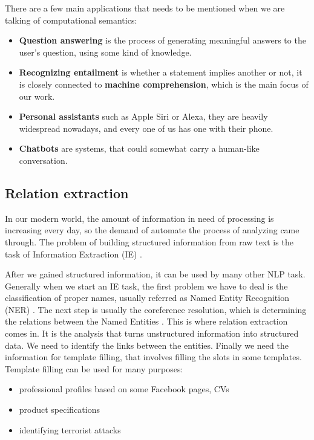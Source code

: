 There are a few main applications that needs to be mentioned when we are talking of computational semantics:
\begin{itemize}
	\item \textbf{Question answering} is the process of generating meaningful answers to the user's question, using some kind of knowledge.
	\item \textbf{Recognizing entailment} is whether a statement implies another or not, it is closely connected to \textbf{machine comprehension}, which is the main focus of our work.
	\item \textbf{Personal assistants} such as Apple Siri or Alexa, they are heavily widespread nowadays, and every one of us has one with their phone.
	\item \textbf{Chatbots} are systems, that could somewhat carry a human-like conversation.
\end{itemize}

\subsection{Relation extraction}
In our modern world, the amount of information in need of processing is increasing every day, so the demand of automate the process of analyzing came through. The problem of building structured information from raw text is the task of Information Extraction (IE) \cite{Jurafsky:2009}.

After we gained structured information, it can be used by many other NLP task. Generally when we start an IE task, the first problem we have to deal is the classification of proper names, usually referred as Named Entity Recognition (NER) \cite{RelationE}. The next step is usually the coreference resolution, which is determining the relations between the Named Entities \cite{Jurafsky:2009}. This is where relation extraction comes in. It is the analysis that turns unstructured information into structured data. We need to identify the links between the entities. Finally we need the information for template filling, that involves filling the slots in some templates. Template filling can be used for many purposes:

\begin{itemize}
	\item professional profiles based on some Facebook pages, CVs
	\item product specifications
	\item identifying terrorist attacks
\end{itemize}

